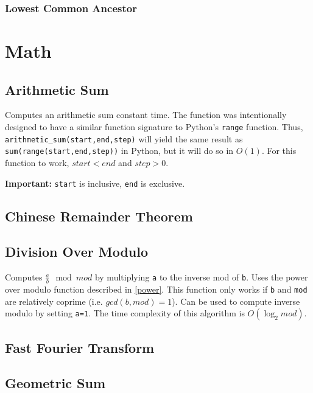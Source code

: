 \documentclass[letterpaper,11pt,twoside]{article}
\begin{document}
                \subsubsection{Lowest Common Ancestor}

        \section{Math}
            \subsection{Arithmetic Sum}
                Computes an arithmetic sum constant time.
                The function was intentionally designed to have a similar function signature to Python's \verb|range| function.
                Thus, \verb|arithmetic_sum(start,end,step)| will yield the same result as \verb|sum(range(start,end,step))| in Python, but it will do so in $O(1)$.
                For this function to work, $start < end$ and $step > 0$.

                \textbf{Important:} \verb|start| is inclusive, \verb|end| is exclusive.
                
                
            \subsection{Chinese Remainder Theorem}
            \subsection{Division Over Modulo}
                Computes $\frac{a}{b} \mod mod$ by multiplying \verb|a| to the inverse mod of \verb|b|.
                Uses the power over modulo function described in \ref{power}.
                This function only works if \verb|b| and \verb|mod| are relatively coprime (i.e. $gcd(b,mod) = 1$).
                Can be used to compute inverse modulo by setting \verb|a=1|.
                The time complexity of this algorithm is $O(\log_2{mod})$.
                
                
            \subsection{Fast Fourier Transform}
            \subsection{Geometric Sum}
\end{document}
